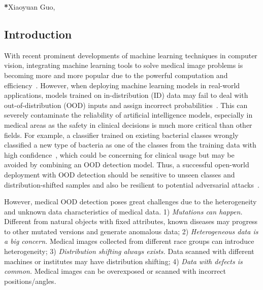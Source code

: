 \documentclass[12pt]{spieman}  %
\begin{document}

{\noindent \footnotesize\textbf{*}Xiaoyuan Guo,   }


\begin{spacing}{2}   %

\section{Introduction}
\label{sect:intro}  %

With recent prominent developments of machine learning techniques in computer vision, integrating machine learning tools to solve medical image problems is becoming more and more popular due to the powerful computation and efficiency~\cite{litjens2017survey}. However, when deploying machine learning models in real-world applications, models trained on in-distribution (ID) data may fail to deal with out-of-distribution (OOD) inputs and assign incorrect probabilities~\cite{song2020critical}. This can severely contaminate the reliability of artificial intelligence models, especially in medical areas as the safety in clinical decisions is much more critical than other fields. For example, a classifier trained on existing bacterial classes wrongly classified a new type of bacteria as one of the classes from the training data with high confidence~\cite{ren2019likelihood:likelihood}, which could be concerning for clinical usage but may be avoided by combining an OOD detection model. Thus, a successful open-world deployment with OOD detection should be sensitive to unseen classes and distribution-shifted samples and also be resilient to potential adversarial attacks~\cite{sehwag2019analyzing}.  

However, medical OOD detection poses great challenges due to the heterogeneity and unknown data characteristics of medical data. 1) \emph{Mutations can happen.} Different from natural objects with fixed attributes, known diseases may progress to other mutated versions and generate anomalous data; 
2) \emph{Heterogeneous data is a big concern.} Medical images collected from different race groups can introduce heterogeneity; 3) \emph{Distribution shifting always exists.} Data scanned with different machines or institutes may have distribution shifting; 4) \emph{Data with defects is common.} Medical images can be overexposed or scanned with incorrect positions/angles.


\end{spacing}
\end{document}
